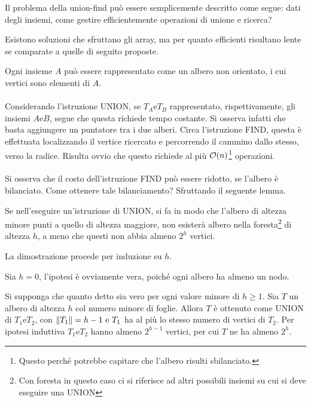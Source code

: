 \documentclass{subfiles}
\begin{document}
Il problema della union-find può essere semplicemente descritto come segue: dati degli insiemi, come gestire efficientemente operazioni di unione e ricerca?

\begin{Note*}
    Esistono soluzioni che sfruttano gli array, ma per quanto efficienti risultano lente se comparate a quelle di seguito proposte.
\end{Note*}

\noindent Ogni insieme \(A\) può essere rappresentato come un albero non orientato, i cui vertici sono elementi di \(A\).
\\ \\
Considerando l'istruzione UNION, se \(T_{A} \text{e} T_{B}\) rappresentato, rispettivamente, gli insiemi \(A \text{e} B\), segue che questa richiede tempo costante.
Si osserva infatti che basta aggiungere un puntatore tra i due alberi.
Circa l'istruzione FIND, questa è effettuata localizzando il vertice ricercato e percorrendo il cammino dallo stesso,
verso la radice. Risulta ovvio che questo richiede al più \(\order{n}\)\footnote[7]{Questo perché potrebbe capitare che l'albero risulti sbilanciato.} operazioni.
\\ \\
Si osserva che il costo dell'istruzione FIND può essere ridotto, se l'albero è bilanciato.
Come ottenere tale bilanciamento? Sfruttando il seguente lemma.

\begin{Lemma}
    Se nell'eseguire un'istruzione di UNION, si fa in modo che l'albero di altezza minore punti a quello di altezza maggiore,
    non esisterà albero nella foresta\footnote[8]{Con foresta in questo caso ci si riferisce ad altri possibili insiemi su cui si deve eseguire una UNION} di altezza \(h\),
    a meno che questi non abbia almeno \(2^{h}\) vertici.

    \begin{Proof*}
        La dimostrazione procede per induzione su \(h\).
        \begin{Base*}
            Sia \(h = 0\), l'ipotesi è ovviamente vera, poiché ogni albero ha almeno un nodo.
        \end{Base*}
        \begin{Induction*}
            Si supponga che quanto detto sia vero per ogni valore minore di \(h \ge 1\).
            Sia \(T\) un albero di altezza \(h\) col numero minore di foglie. Allora \(T\) è ottenuto come UNION di \(T_{1} \text{e} T_{2}\),
            con \(\norm{T_{1}} = h - 1 \text{e} T_{1}\) ha al più lo stesso numero di vertici di \(T_{2}\).
            Per ipotesi induttiva \(T_{1} \text{e} T_{2}\) hanno almeno \(2^{h - 1}\) vertici, per cui \(T\) ne ha almeno \(2^{h}\).
        \end{Induction*}
    \end{Proof*}
\end{Lemma}
\end{document}
